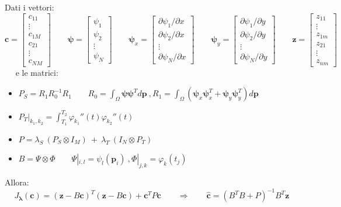 \documentclass[landscape,9pt]{beamer}                           %
\begin{document}
\begin{frame}
Dati i vettori:
$$
\bm{c} =
\begin{bmatrix}
c_{11}  \\
\vdots\\
c_{1M}  \\
c_{21}  \\
\vdots\\
c_{NM}
\end{bmatrix}
\qquad
\bm \psi =
\begin{bmatrix}
\psi_{1}  \\
\psi_{2}  \\
\vdots\\
\psi_{N}
\end{bmatrix}
\qquad
\bm \psi_x=  \begin{bmatrix}
\partial \psi_{1}/\partial x \\
\partial \psi_{2}/\partial x  \\
\vdots\\
\partial \psi_{N}/\partial x \end{bmatrix} 
\qquad
\bm \psi_y=  \begin{bmatrix}
\partial \psi_{1}/\partial y  \\
\partial \psi_{2}/\partial y  \\
\vdots\\
\partial \psi_{N}/\partial y\end{bmatrix}
\qquad
\bm z =
\begin{bmatrix}
z_{11}  \\
\vdots\\
z_{1m}  \\
z_{21}  \\
\vdots\\
z_{nm}
\end{bmatrix}
$$
\ \ 
\newline
e le matrici: 
\begin{itemize}
\item $P_S=R_1 R_0^{-1} R_1 \qquad R_0 = \int_\Omega \bm \psi \bm \psi^T d \bm p \ , R_1 = \int_\Omega (\bm \psi_x \bm \psi_x^T + \bm \psi_y \bm \psi_y^T)d \bm p$
\item $P_T|_{k_1,k_2} =\int_{T_1}^{T_2} \varphi_{k_1}''(t) \varphi_{k_2}''(t)$
\item $P = \lambda_S\    (P_S \otimes I_M)   \ +\  \lambda_T\   (I_N \otimes P_T)$
\item $B = \Psi \otimes \Phi \qquad \Psi|_{i,l}=\psi_{l}(\bm p_i) \ , \Phi|_{j,k}=\varphi_{k}( t_j)$
\end{itemize}
Allora:
$$
J_{\bm \lambda }(\bm c) = (\bm z - B \bm c)^T (\bm z - B \bm c) + \bm c^T P \bm c \qquad \Rightarrow \qquad \hat  {\bm c} = (B^T B + P)^{-1}B^T \bm z
$$
\end{frame}
\end{document}
